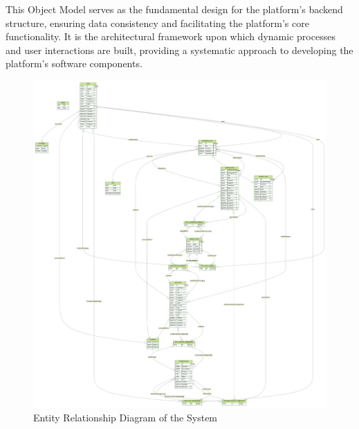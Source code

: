 \documentclass[12pt]{report}
\begin{document}
This Object Model serves as the fundamental design for the platform's backend structure, ensuring data consistency and facilitating the platform's core functionality. It is the architectural framework upon which dynamic processes and user interactions are built, providing a systematic approach to developing the platform's software components.
\clearpage %
\begin{figure}[p] %
\centering %
\includegraphics[width=\textwidth,height=\textheight,keepaspectratio]{ERD.png} %
\caption{Entity Relationship Diagram of the System} %
\label{fig:er_diagram} %
\end{figure}
\clearpage %
\end{document}
